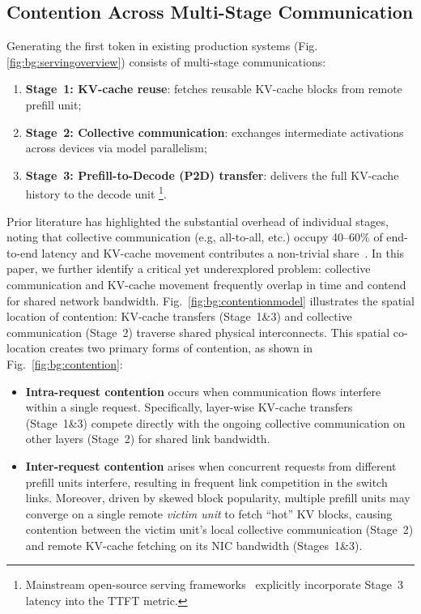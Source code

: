 


\subsection{Contention Across Multi-Stage Communication}

Generating the first token in existing production systems (Fig. \ref{fig:bg:servingoverview}) consists of multi-stage communications:
\begin{enumerate}[label=\(\bullet\),leftmargin=*]
    \item \textbf{Stage~1: KV-cache reuse}: fetches reusable KV-cache blocks from remote prefill unit;
    \item \textbf{Stage~2: Collective communication}: exchanges intermediate activations across devices via model parallelism;
    \item \textbf{Stage~3: Prefill-to-Decode (P2D) transfer}: delivers the full KV-cache history to the decode unit \footnote{Mainstream open-source serving frameworks~\cite{vllm_pd_2025,sglang_pd_2025,dynamo_pd_2025} explicitly incorporate Stage~3 latency into the TTFT metric.}.
\end{enumerate}

Prior literature has highlighted the substantial overhead of individual stages, noting that collective communication (e.g, all-to-all, etc.) occupy 40--60\% of end-to-end latency \cite{linaatc,comet,li2025optimizing,CP} and KV-cache movement contributes a non-trivial share~\cite{cachegen,mooncake,chen2024kvdirect,li2025flowkv,yoon2025tract}. In this paper, we further identify a critical yet underexplored problem: collective communication and KV-cache movement frequently overlap in time and contend for shared network bandwidth. Fig.~\ref{fig:bg:contentionmodel} illustrates the spatial location of contention: KV-cache transfers (Stage~1\&3) and collective communication (Stage~2) traverse shared physical interconnects. This spatial co-location creates two primary forms of contention, as shown in Fig.~\ref{fig:bg:contention}:
\begin{itemize}[leftmargin=*]
    \item \textbf{Intra-request contention} occurs when communication flows interfere within a single request. Specifically, layer-wise KV-cache transfers (Stage~1\&3) compete directly with the ongoing collective communication on other layers (Stage~2) for shared link bandwidth.
    \item \textbf{Inter-request contention} arises when concurrent requests from different prefill units interfere, resulting in frequent link competition in the switch links. Moreover, driven by skewed block popularity, multiple prefill units may converge on a single remote \textit{victim unit} to fetch ``hot'' KV blocks, causing contention between the victim unit's local collective communication (Stage~2) and remote KV-cache fetching on its NIC bandwidth (Stages~1\&3).
\end{itemize}

